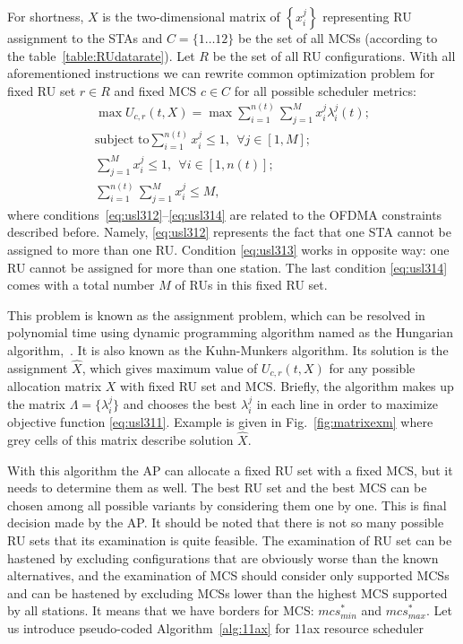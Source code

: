 For shortness, $X$ is the two-dimensional matrix of $\left\{x_i^j\right\}$ representing RU assignment to the STAs and $C = \{1\dots12\}$ be the set of all MCSs (according to the table~\ref{table:RUdatarate}). Let $R$ be the set of all RU configurations. With all aforementioned instructions we can rewrite common optimization problem for fixed RU set $r \in R$ and fixed MCS $c \in C$ for all possible scheduler metrics:
\begin{align} \label{eq:usl311}
\max U_{c, r}(t,X) = \max \sum^{n(t)}_{i = 1} \sum_{j = 1}^{M} x_i^j \lambda_i^j(t); \\ \label{eq:usl312}
\text{subject to} \sum_{i=1}^{n(t)} x_i^j \leq 1,\ \  \forall j \in [1,M]; \\ \label{eq:usl313}
\sum_{j = 1}^{M} x_i^j \leq 1, \ \ \forall i \in [1, n(t)]; \\ \label{eq:usl314}
\sum_{i = 1}^{n(t)} \sum_{j = 1}^{M} x_i^j \leq M,
\end{align}
where conditions~\eqref{eq:usl312}--\eqref{eq:usl314} are related to the OFDMA  constraints described before. 
Namely, \eqref{eq:usl312} represents the fact that one STA cannot be assigned to more than one RU. Condition \eqref{eq:usl313} works in opposite way: one RU cannot be assigned for more than one station. The last condition \eqref{eq:usl314} comes with a total number $M$ of RUs in this fixed RU set.

This problem is known as the assignment problem, which can be resolved in polynomial time using dynamic programming algorithm named as the Hungarian algorithm,~\cite{bourgeois1971extension}.
It is also known as the Kuhn-Munkers algorithm. 
Its solution is the assignment $\hat X$, which gives maximum value of $U_{c, r}(t,X)$  for any possible allocation matrix $X$ with fixed RU set and MCS. 
Briefly, the algorithm makes up the matrix $\Lambda = \{\lambda_i^j\}$ and chooses the best $\lambda_i^j$ in each line in order to maximize objective function \ref{eq:usl311}. Example is given in Fig.~\ref{fig:matrixexm} where grey cells of this matrix describe solution $\hat X$. 

With this algorithm the AP can allocate a fixed RU set with a fixed MCS, but it needs to determine them as well. The best RU set and the best MCS can be chosen among all possible variants by considering them one by one. This is final decision made by the AP. 
\textcolor{prpl}{It should be noted that there is not so many possible RU sets that its examination is quite feasible.}
The examination of RU set can be hastened by excluding configurations that are obviously worse than the known alternatives, and the examination of MCS should consider only supported MCSs and can be hastened by excluding MCSs lower than the highest MCS supported by all stations. It means that we have borders for MCS: $mcs^{*}_{min}$ and $mcs^{*}_{max}$. Let us introduce pseudo-coded Algorithm~\ref{alg:11ax} for 11ax resource scheduler 

